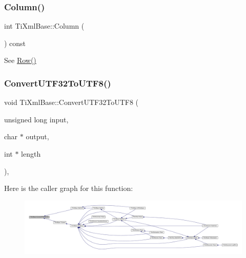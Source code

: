 \subsubsection{\texorpdfstring{Column()}{Column()}}
{\footnotesize\ttfamily int Ti\+Xml\+Base\+::\+Column (\begin{DoxyParamCaption}{ }\end{DoxyParamCaption}) const\hspace{0.3cm}{\ttfamily [inline]}}



See \hyperlink{class_ti_xml_base_ad0cacca5d76d156b26511f46080b442e}{Row()} 

\mbox{\label{class_ti_xml_base_a07c765e3a7f979d343e646ea797b180b}} 
\subsubsection{\texorpdfstring{Convert\+U\+T\+F32\+To\+U\+T\+F8()}{ConvertUTF32ToUTF8()}}
{\footnotesize\ttfamily void Ti\+Xml\+Base\+::\+Convert\+U\+T\+F32\+To\+U\+T\+F8 (\begin{DoxyParamCaption}\item[{unsigned long}]{input,  }\item[{char $\ast$}]{output,  }\item[{int $\ast$}]{length }\end{DoxyParamCaption})\hspace{0.3cm}{\ttfamily [static]}, {\ttfamily [protected]}}

Here is the caller graph for this function\+:
\nopagebreak
\begin{figure}[H]
\begin{center}
\leavevmode
\includegraphics[width=350pt]{class_ti_xml_base_a07c765e3a7f979d343e646ea797b180b_icgraph}
\end{center}
\end{figure}
\mbox{\label{class_ti_xml_base_a32ed202562b58de64c7d799ca3c9db98}} 

